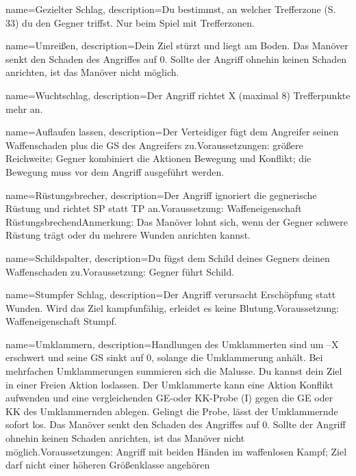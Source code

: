 {
    name={Gezielter Schlag},
    description={Du bestimmst, an welcher Trefferzone (S. 33) du den Gegner triffst. Nur beim Spiel mit Trefferzonen.}
}


{
    name={Umreißen},
    description={Dein Ziel stürzt und liegt am Boden. Das Manöver senkt den Schaden des Angriffes auf 0. Sollte der Angriff ohnehin keinen Schaden anrichten, ist das Manöver nicht möglich.}
}


{
    name={Wuchtschlag},
    description={Der Angriff richtet X (maximal 8) Trefferpunkte mehr an.}
}


{
    name={Auflaufen lassen},
    description={Der Verteidiger fügt dem Angreifer seinen Waffenschaden plus die GS des Angreifers zu.\newline Voraussetzungen: größere Reichweite; Gegner kombiniert die Aktionen Bewegung und Konflikt; die Bewegung muss vor dem Angriff ausgeführt werden.}
}


{
    name={Rüstungsbrecher},
    description={Der Angriff ignoriert die gegnerische Rüstung und richtet SP statt TP an.\newline Voraussetzung: Waffeneigenschaft Rüstungsbrechend\newline Anmerkung: Das Manöver lohnt sich, wenn der Gegner schwere Rüstung trägt oder du mehrere Wunden anrichten kannst.}
}


{
    name={Schildspalter},
    description={Du fügst dem Schild deines Gegners deinen Waffenschaden zu.\newline Voraussetzung: Gegner führt Schild.}
}


{
    name={Stumpfer Schlag},
    description={Der Angriff verursacht Erschöpfung statt Wunden. Wird das Ziel kampfunfähig, erleidet es keine Blutung.\newline Voraussetzung: Waffeneigenschaft Stumpf.}
}


{
    name={Umklammern},
    description={Handlungen des Umklammerten sind um –X erschwert und seine GS sinkt auf 0, solange die Umklammerung anhält. Bei mehrfachen Umklammerungen summieren sich die Malusse. Du kannst dein Ziel in einer Freien Aktion loslassen. Der Umklammerte kann eine Aktion Konflikt aufwenden und eine vergleichenden GE-oder KK-Probe (I) gegen die GE oder KK des Umklammernden ablegen. Gelingt die Probe, lässt der Umklammernde sofort los. Das Manöver senkt den Schaden des Angriffes auf 0. Sollte der Angriff ohnehin keinen Schaden anrichten, ist das Manöver nicht möglich.\newline Voraussetzungen: Angriff mit beiden Händen im waffenlosen Kampf; Ziel darf nicht einer höheren Größenklasse angehören}
}


